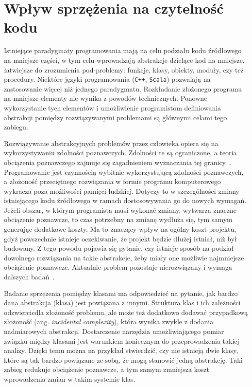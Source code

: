 \section{Wpływ sprzężenia na czytelność kodu}

Istniejące paradygmaty programowania mają na celu podziału kodu źródłowego na mniejsze części, w tym celu
wprowadzają abstrakcje dzielące kod na mniejsze, łatwiejsze do zrozumienia pod-problemy: funkcje, klasy, obiekty,
moduły, czy też procedury.
Niektóre języki programowania (\texttt{C++}, \texttt{Scala}) pozwalają na zastosowanie więcej niż jednego paradygmatu.
Rozkładanie złożonego programu na mniejsze elementy nie wynika z powodów technicznych.
Ponowne wykorzystanie tych elementów i umożliwienie programistom definiowania abstrakcji pomiędzy rozwiązywanymi
problemami są głównymi celami tego zabiegu.

Rozwiązywanie abstrakcyjnych problemów przez człowieka opiera się na wykorzystywaniu zdolności poznawczych.
Zdolności te są ograniczone, a teoria obciążenia poznawczego zajmuje się zagadnieniem wyznaczania tej granicy~\cite{plass2010cognitive}.
Programowanie jest czynnością wybitnie wykorzystującą zdolności poznawczych, a złożoność przeciętnego rozwiązania w
formie programu komputerowego wykracza poza możliwości pamięci ludzkiej.
Dotyczy to w szczególności zmiany istniejącego kodu źródłowego w ramach dostosowywania go do nowych wymagań.
Jeżeli obszar, w którym programista musi wykonać zmiany, wytwarza znaczne obciążenie poznawcze, to czas potrzebny na
zmianę wydłuża się, tym samym generując dodatkowe koszty.
Ma to znaczący wpływ na ogólny koszt projektu, gdyż powszechnie istnieje oczekiwanie, że projekt będzie dłużej istniał,
niż był budowany.
Z tego powodu pojawia się pytanie, czy istnieje sposób na podział dowolnego rozwiązania na takie abstrakcje, żeby
miały one możliwie najmniejsze obciążenie poznawcze.
Aktualnie problem pozostaje nierozwiązany i wymaga dalszych badań~\cite{yousoof2007measuring}.

Badanie sprzężenia pomiędzy klasami ma odpowiedzieć na pytanie, jak bardzo dana abstrakcja (klasa) jest powiązana z
innymi.
Struktura klas i ich zależności odzwierciedla złożoność problemu, ale może też dodatkowo dodawać przypadkową złożoność
(ang. \textit{incidental complexity}), która wynika zwykle z dodania nadmiarowych abstrakcji.
Dostarczenie narzędzia umożliwiającego pomiar związku między klasami jest warunkiem koniecznym do przeprowadzenia
takiej analizy.
Dzięki temu można na przykład stwierdzić, czy nie istnieją dwie klasy, które są tak bardzo powiązane ze sobą, że mogą
stanowić jedną abstrakcję.
Taki zabieg redukuje obciążenie poznawcze, a tym samym zmniejsza koszt wprowadzenia zmian w takim systemie klas.

